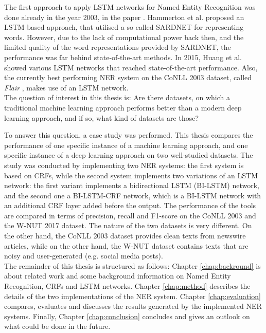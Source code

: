 \documentclass[12pt]{book}
\begin{document}
    The first approach to apply LSTM networks for Named Entity Recognition was done already in the year 2003, in the paper \cite{hammerton-2003-named}. Hammerton et al. proposed an LSTM based approach, that utilised a so called SARDNET \cite{james1995sardnet} for representing words. However, due to the lack of computational power back then, and the limited quality of the word representations provided by SARDNET, the performance was far behind state-of-the-art methods.
    In 2015, Huang et al. \cite{huang2015bidirectional} showed various LSTM networks that reached state-of-the-art performance. Also, the currently best performing NER system on the CoNLL 2003 \cite{tjongkimsang2003conll} dataset, called \textit{Flair} \cite{akbik2018contextual}, makes use of an LSTM network. \\
    
    The question of interest in this thesis is: Are there datasets, on which a traditional machine learning approach performs better than a modern deep learning approach, and if so, what kind of datasets are those?
    
    To answer this question, a case study was performed. This thesis compares the performance of one specific instance of a machine learning approach, and one specific instance of a deep learning approach on two well-studied datasets. The study was conducted by implementing two NER systems: the first system is based on CRFs, while the second system implements two variations of an LSTM network: the first variant implements a bidirectional LSTM (BI-LSTM) network, and the second one a BI-LSTM-CRF network, which is a BI-LSTM network with an additional CRF layer added before the output. The performance of the tools are compared in terms of precision, recall and F1-score on the CoNLL 2003 and the W-NUT 2017 \cite{derczynski2017results} dataset. The nature of the two datasets is very different. On the other hand, the CoNLL 2003 dataset provides clean texts from newswire articles, while on the other hand, the W-NUT dataset contains texts that are noisy and user-generated (e.g. social media posts).\\
    
    The remainder of this thesis is structured as follows: Chapter \ref{chap:backround} is about related work and some background information on Named Entity Recognition, CRFs and LSTM networks. Chapter \ref{chap:method} describes the details of the two implementations of the NER system. Chapter \ref{chap:evaluation} compares, evaluates and discusses the results generated by the implemented NER systems. Finally, Chapter \ref{chap:conclusion} concludes and gives an outlook on what could be done in the future.
   
\end{document}
